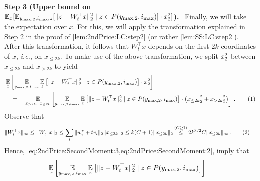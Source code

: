 \documentclass[11pt,letterpaper]{article}
\theoremstyle{plain}
\theoremstyle{definition}
\theoremstyle{remark}
\newcommand{\yesnum}{\addtocounter{equation}{1}\tag{\theequation}}
\newcommand{\Stackrel}[2]{\stackrel{\mathmakebox[\widthof{\ensuremath{#2}}]{#1}}{#2}}
\newcommand{\inparen}[1]{\ensuremath{\left(#1\right)}}
\newcommand{\insquare}[1]{\ensuremath{\left[#1\right]}}
\newcommand{\snorm}[1]{\ensuremath{\ensuremath{\| #1 \|}}}
\let\norm\relax
\newcommand{\norm}[1]{\ensuremath{\left\lVert #1 \right\rVert}}
\newcommand{\E}{\operatornamewithlimits{\mathbb{E}}}
\newcommand{\Ex}{\E}
\renewcommand{\paragraph}[1]{\medskip \noindent\textbf{#1}~}
\newcommand{\ie}{\emph{i.e.}}
\newcommand{\smax}{\max,2} %
\newcommand{\imax}{i_{\max}}
\newcommand{\ysmax}{y_{\smax}}
\begin{document}
{{        \paragraph{Step 3 (Upper bound on $\Ex_{x}[\Ex_{\ysmax,\imax,z}[\snorm{z - W_t^\top x}_2^2 \mid z\in P(\ysmax,\imax)]\cdot \norm{x}_2^2]$).}
            Finally, we will take the expectation over $x$.
            For this, we will apply the transformation explained in Step 2 in the proof of \cref{lem:2ndPrice:LC:step2} (or rather \cref{lem:SS:LC:step2}).
            After this transformation, it follows that $W_t^\top x$ depends on the first $2k$ coordinates of $x$, \ie{}, on $x_{\leq 2k}$. 
            To make use of the above transformation, we split $\norm{x}_2^2$ between $x_{\leq 2k}$ and $x_{>2k}$ to yield
            \begin{align*}
                &\Ex_{x}\insquare{
                \Ex_{\ysmax,\imax}
                \Ex_z\insquare{
                    \snorm{z - W_t^\top x}_2^2  \mid z\in P(\ysmax,\imax)
                }
                \cdot 
                \norm{x}_2^2 
                }\\
                &\quad=\quad
                \Ex_{x_{>2k},~x_{\leq 2k}}\insquare{
                    \Ex_{\ysmax,\imax}
                    \Ex_z\insquare{
                        \snorm{z - W_t^\top x}_2^2  \mid z\in P(\ysmax,\imax)
                    }
                    \cdot 
                    \inparen{
                        \norm{x_{\leq 2k}}_2^2 
                        + 
                        \norm{x_{> 2k}}_2^2 
                    }
                }\,.
                \yesnum\label{eq:2ndPrice:SecondMoment:3}
            \end{align*}
            Observe that 
            \begin{align*}
                \snorm{W_t^\top x}_\infty 
                \leq \snorm{W_t^\top x}_2
                &\leq \sum_i \snorm{w^\star_i + t v_i}_2 \snorm{x_{\leq 2k}}_2
                \leq 
                {k(C+1)}\snorm{x_{\leq 2k}}_2
                ~~\Stackrel{(C\geq 1)}{\leq}~~ 2k^{3/2}C \snorm{x_{\leq 2k}}_\infty \,.
                \yesnum\label{eq:2ndPrice:SecondMoment:2}
            \end{align*}
            Hence,  \cref{eq:2ndPrice:SecondMoment:3,eq:2ndPrice:SecondMoment:2}, imply that 
            \begin{align*}
                &\Ex_{x}\insquare{
                \Ex_{\ysmax,\imax}
                \Ex_z\insquare{
                    \snorm{z - W_t^\top x}_2^2  \mid z\in P(\ysmax,\imax)
}}
\end{align*}}}
\end{document}
